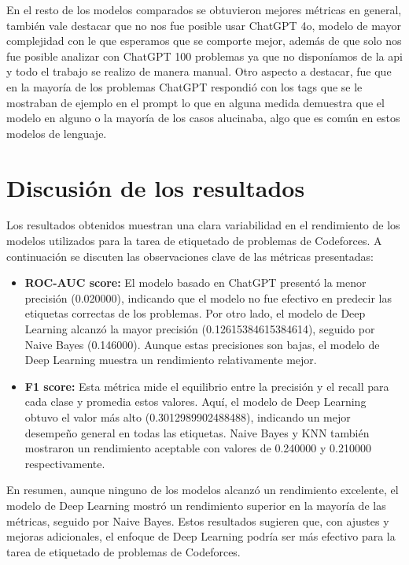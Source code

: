 \documentclass{article}
\begin{document}
En el resto de los modelos comparados se obtuvieron mejores métricas en general, también vale destacar que no nos fue posible
usar ChatGPT 4o, modelo de mayor complejidad con le que esperamos que se comporte mejor, además de que solo nos fue posible 
analizar con ChatGPT 100 problemas ya que no disponíamos de la api y todo el trabajo se realizo de manera manual. Otro aspecto
a destacar, fue que en la mayoría de los problemas ChatGPT respondió  con los tags que se le mostraban de ejemplo en el prompt
lo que en alguna medida demuestra que el modelo en alguno o la mayoría de los casos alucinaba, algo que es común en estos modelos 
de lenguaje.

\section{Discusión de los resultados}
Los resultados obtenidos muestran una clara variabilidad en el rendimiento de los modelos utilizados para la tarea de etiquetado de problemas de Codeforces. A continuación se discuten las observaciones clave de las métricas presentadas:

\begin{itemize}
    \item \textbf{ROC-AUC score:} El modelo basado en ChatGPT presentó la menor precisión (0.020000), indicando que el modelo no fue efectivo en predecir las etiquetas correctas de los problemas. Por otro lado, el modelo de Deep Learning alcanzó la mayor precisión (0.12615384615384614), seguido por Naive Bayes (0.146000). Aunque estas precisiones son bajas, el modelo de Deep Learning muestra un rendimiento relativamente mejor.
          
    \item \textbf{F1 score:} Esta métrica mide el equilibrio entre la precisión y el recall para cada clase y promedia estos valores. Aquí, el modelo de Deep Learning obtuvo el valor más alto (0.3012989902488488), indicando un mejor desempeño general en todas las etiquetas. Naive Bayes y KNN también mostraron un rendimiento aceptable con valores de 0.240000 y 0.210000 respectivamente.       
\end{itemize}

En resumen, aunque ninguno de los modelos alcanzó un rendimiento excelente, el modelo de Deep Learning mostró un rendimiento superior en la mayoría de las métricas, seguido por Naive Bayes. Estos resultados sugieren que, con ajustes y mejoras adicionales, el enfoque de Deep Learning podría ser más efectivo para la tarea de etiquetado de problemas de Codeforces.
\end{document}
